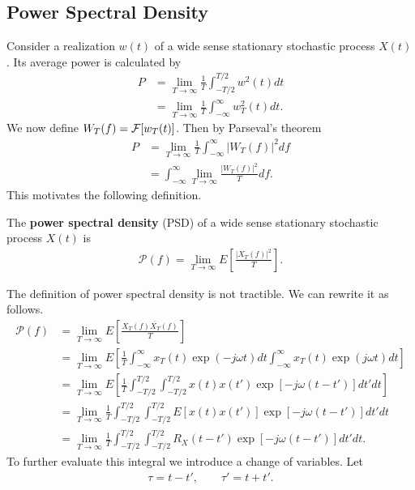 \documentclass{memoir}
\begin{document}
\subsection{Power Spectral Density}
Consider a realization $w(t)$ of a wide sense stationary stochastic process $X(t)$. Its average power is calculated by
\begin{align*}
    P &= \lim_{T \to \infty} \frac{1}{T} \int_{-T/2}^{T/2} w^2(t) dt \\
    &= \lim_{T \to \infty} \frac{1}{T} \int_{-\infty}^{\infty} w_T^2(t) dt.
\end{align*}
We now define $W_T(f) = \mathcal{F}[w_T(t)]$. Then by Parseval's theorem
\begin{align*}
    P &= \lim_{T \to \infty} \frac{1}{T} \int_{-\infty}^{\infty} |W_T(f)|^2 df \\
    &= \int_{-\infty}^{\infty} \lim_{T \to \infty} \frac{|W_T(f)|^2}{T} df.
\end{align*}
This motivates the following definition.
\begin{definition}
    The \textbf{power spectral density} (PSD) of a wide sense stationary stochastic process $X(t)$ is
    \begin{align*}
        \mathcal{P}(f) = \lim_{T \to \infty} E\left[ \frac{|X_T(f)|^2}{T} \right].
    \end{align*}
\end{definition}
The definition of power spectral density is not tractible. We can rewrite it as follows.
\begin{align*}
    \mathcal{P}(f) &= \lim_{T \to \infty} E\left[\frac{X_T(f) \bar{X_T}(f)}{T}\right] \\
    &= \lim_{T \to \infty}E\left[\frac{1}{T}\int_{-\infty}^{\infty}x_T(t)\exp(-j \omega t)dt\int_{-\infty}^{\infty}x_T(t)\exp(j \omega t)dt\right] \\
    &= \lim_{T \to \infty}E\left[\frac{1}{T}\int_{-T/2}^{T/2}\int_{-T/2}^{T/2}x(t)x(t')\exp[-j \omega (t-t')]dt'dt\right] \\
    &= \lim_{T \to \infty}\frac{1}{T}\int_{-T/2}^{T/2}\int_{-T/2}^{T/2}E[x(t)x(t')]\exp[-j \omega (t-t')]dt'dt \\
    &= \lim_{T \to \infty}\frac{1}{T}\int_{-T/2}^{T/2}\int_{-T/2}^{T/2}R_X(t-t')\exp[-j \omega (t-t')]dt'dt.
\end{align*}
To further evaluate this integral we introduce a change of variables. Let
\begin{align*}
    \tau = t - t', \qquad \tau' = t + t'.
\end{align*}
\end{document}
